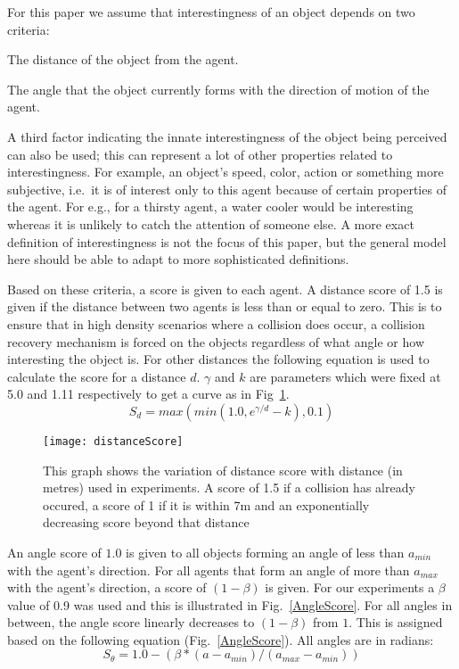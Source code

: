 \documentclass[runningheads,a4paper]{llncs}
\begin{document}
For this paper we assume that interestingness of an object depends on two criteria:
\begin{inparaenum}
 \item The distance of the object from the agent. 
 \item The angle that the object currently forms with the direction of motion of the agent. 
\end{inparaenum}
A third factor indicating the innate interestingness of the object being perceived can also be used; this can represent a lot of other properties related to interestingness. For example, an object's speed, color, action or something more subjective, i.e.\ it is of interest only to this agent because of certain properties of the agent. For e.g., for a thirsty agent, a water cooler would be interesting whereas it is unlikely to catch the attention of someone else. A more exact definition of interestingness is not the focus of this paper, but the general model here should be able to adapt to more sophisticated definitions.

Based on these criteria, a score is given to each agent. A distance score of 1.5 is given if the distance between two agents is less than or equal to zero. This is to ensure that in high density scenarios where a collision does occur, a collision recovery mechanism is forced on the objects regardless of what angle or how interesting the object is. For other distances the following equation is used to calculate the score for a distance $d$. $\gamma$ and $k$ are parameters which were fixed at 5.0 and 1.11 respectively to get a curve as in Fig~\ref{DistanceScore}.
\begin{equation}
    S_d = max(min(1.0, e^{\gamma / d} - k),0.1)
\end{equation}

\begin{figure}[!tb]
\centering
\texttt{[image: distanceScore]}
\caption{This graph shows the variation of distance score with distance (in metres) used in experiments. A score of 1.5 if a collision has already occured, a score of 1 if it is within 7m and an exponentially decreasing score beyond that distance}
\label{DistanceScore}
\end{figure}

An angle score of $1.0$ is given to all objects forming an angle of less than $a_{min}$ with the agent's direction. For all agents that form an angle of more than $a_{max} $ with the agent's direction,  a score of $ (1-\beta) $ is given. For our experiments a $\beta$ value of 0.9 was used and this is illustrated in Fig.~\ref{AngleScore}. For all angles in between, the angle score linearly decreases to $ (1-\beta) $ from $1$. This is assigned based on the following equation (Fig.~\ref{AngleScore}). All angles are in radians:
\begin{equation}
  S_{\theta} = 1.0 - (\beta * (a - a_{min} ) /  (a_{max}-a_{min}))
\end{equation}
\end{document}

